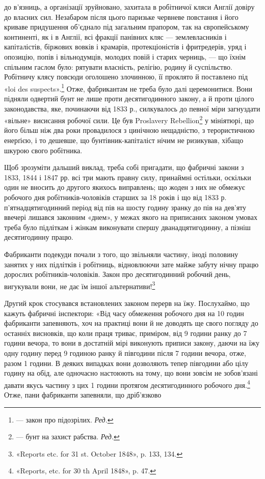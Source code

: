 до в’язниць, а організації зруйновано, захитала в робітничої
кляси Англії довіру до власних сил. Незабаром після цього паризьке
червневе повстання і його криваве придушення об’єднало
під загальним прапором, так на європейському континенті, як
і в Англії, всі фракції панівних кляс — землевласників і капіталістів,
біржових вовків і крамарів, протекціоністів і фритредерів,
уряд і опозицію, попів і вільнодумців, молодих повій і
старих черниць, — що їхнім спільним гаслом було: рятувати власність,
релігію, родину й суспільство. Робітничу клясу повсюди
оголошено злочинною, її проклято й поставлено під «loi des
suspects».\footnote*{
— закон про підозрілих. \emph{Ред.}
} Отже, фабрикантам не треба було далі церемонитися.
Вони підняли одвертий бунт не лише проти десятигодинного закону,
а й проти цілого законодавства, яке, починаючи від 1833 р., силкувалось
до певної міри загнуздати «вільне» висисання робочої
сили. Це був Proslavery Rebellion\footnote*{
— бунт на захист рабства. \emph{Ред.}
} у мініятюрі, що його більш
ніж два роки провадилося з цинічною нещадністю, з терористичною
енерґією, і то дешевше, що бунтівник-капіталіст нічим
не ризикував, хібащо шкурою свого робітника.

Щоб зрозуміти дальший виклад, треба собі пригадати, що
фабричні закони з 1833, 1844 і 1847 рр. всі три мають правну
силу, принаймні остільки, оскільки один не вносить до другого
якихось виправлень; що жоден з них не обмежує робочого дня
робітників-чоловіків старших за 18 років і що від 1833 р. п’ятнадцятигодинний
період від пів на шосту годину зранку до пів
на дев’яту ввечері лишався законним «днем», у межах якого
на приписаних законом умовах треба було підліткам і жінкам
виконувати спершу дванадцятигодинну, а пізніш десятигодинну
працю.

Фабриканти подекуди почали з того, що звільняли частину,
іноді половину занятих у них підлітків і робітниць, відновлюючи
зате майже забуту нічну працю дорослих робітників-чоловіків.
Закон про десятигодинний робочий день, вигукували вони, не
дає їм іншої альтернативи!\footnote{
«Reports etc. for 31 st. October 1848», p. 133, 134.
}

Другий крок стосувався встановлених законом перерв на їжу.
Послухаймо, що кажуть фабричні інспектори: «Від часу обмеження
робочого дня на 10 годин фабриканти запевняють, хоч на практиці
вони й не доводять ще свого погляду до останніх висновків,
що коли праця триває, приміром, від 9 години ранку до 7 години
вечора, то вони в достатній мірі виконують приписи закону, даючи
на їжу одну годину перед 9 годиною ранку й півгодини після
7 години вечора, отже, разом 1 години. В деяких випадках
вони дозволяють тепер півгодини або цілу годину на обід, але одночасно
настоюють на тому, що вони зовсім не зобов’язані давати
якусь частину з цих 1 години протягом десятигодинного робочого
дня.\footnote{
«Reports, etc. for 30 th April 1848», p. 47.
} Отже, пани фабриканти запевняли, що дріб’язково